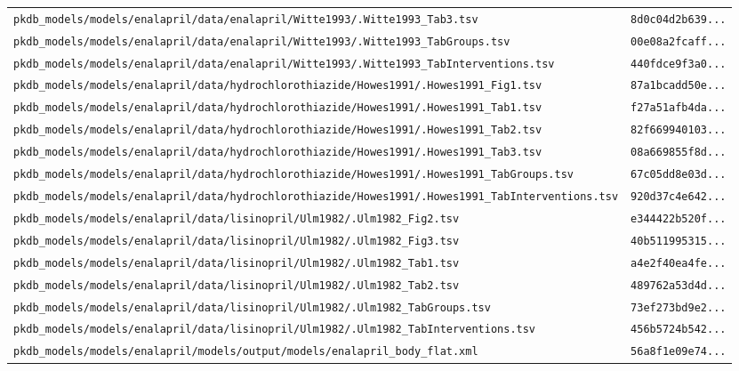 \begin{longtable}{ll}
\texttt{pkdb\_models/models/enalapril/data/enalapril/Witte1993/.Witte1993\_Tab3.tsv} & \texttt{8d0c04d2b639...} \\
\texttt{pkdb\_models/models/enalapril/data/enalapril/Witte1993/.Witte1993\_TabGroups.tsv} & \texttt{00e08a2fcaff...} \\
\texttt{pkdb\_models/models/enalapril/data/enalapril/Witte1993/.Witte1993\_TabInterventions.tsv} & \texttt{440fdce9f3a0...} \\
\texttt{pkdb\_models/models/enalapril/data/hydrochlorothiazide/Howes1991/.Howes1991\_Fig1.tsv} & \texttt{87a1bcadd50e...} \\
\texttt{pkdb\_models/models/enalapril/data/hydrochlorothiazide/Howes1991/.Howes1991\_Tab1.tsv} & \texttt{f27a51afb4da...} \\
\texttt{pkdb\_models/models/enalapril/data/hydrochlorothiazide/Howes1991/.Howes1991\_Tab2.tsv} & \texttt{82f669940103...} \\
\texttt{pkdb\_models/models/enalapril/data/hydrochlorothiazide/Howes1991/.Howes1991\_Tab3.tsv} & \texttt{08a669855f8d...} \\
\texttt{pkdb\_models/models/enalapril/data/hydrochlorothiazide/Howes1991/.Howes1991\_TabGroups.tsv} & \texttt{67c05dd8e03d...} \\
\texttt{pkdb\_models/models/enalapril/data/hydrochlorothiazide/Howes1991/.Howes1991\_TabInterventions.tsv} & \texttt{920d37c4e642...} \\
\texttt{pkdb\_models/models/enalapril/data/lisinopril/Ulm1982/.Ulm1982\_Fig2.tsv} & \texttt{e344422b520f...} \\
\texttt{pkdb\_models/models/enalapril/data/lisinopril/Ulm1982/.Ulm1982\_Fig3.tsv} & \texttt{40b511995315...} \\
\texttt{pkdb\_models/models/enalapril/data/lisinopril/Ulm1982/.Ulm1982\_Tab1.tsv} & \texttt{a4e2f40ea4fe...} \\
\texttt{pkdb\_models/models/enalapril/data/lisinopril/Ulm1982/.Ulm1982\_Tab2.tsv} & \texttt{489762a53d4d...} \\
\texttt{pkdb\_models/models/enalapril/data/lisinopril/Ulm1982/.Ulm1982\_TabGroups.tsv} & \texttt{73ef273bd9e2...} \\
\texttt{pkdb\_models/models/enalapril/data/lisinopril/Ulm1982/.Ulm1982\_TabInterventions.tsv} & \texttt{456b5724b542...} \\
\texttt{pkdb\_models/models/enalapril/models/output/models/enalapril\_body\_flat.xml} & \texttt{56a8f1e09e74...} \\
\end{longtable}

